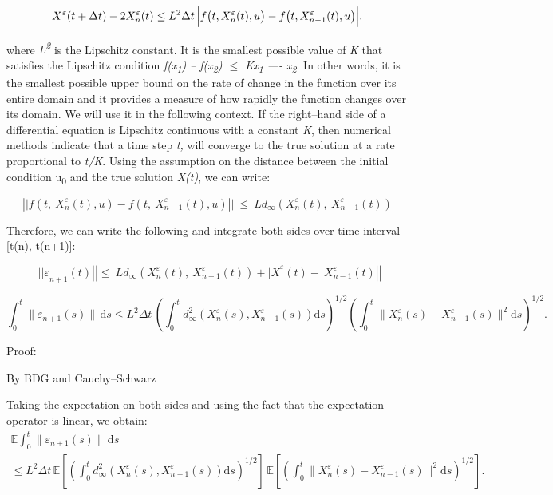\documentclass[12pt,a4paper]{report}
\numberwithin{equation}{section}
\begin{document}
\[
X^{\varepsilon}(t+\Delta t)-2X_{n}^{\varepsilon}(t)
\le L^{2}\Delta t\,
\Bigl|f\bigl(t,X_{n}^{\varepsilon}(t),u\bigr)-f\bigl(t,X_{n-1}^{\varepsilon}(t),u\bigr)\Bigr|.
\]


where \emph{L\textsuperscript{2}} is the Lipschitz constant. It is the
smallest possible value of \emph{K} that satisfies the Lipschitz
condition \textbar{}\emph{f(x\textsubscript{1}) --
f(x\textsubscript{2})\textbar{} $\leq$ K\textbar x\textsubscript{1} ----
x\textsubscript{2}}\textbar. In other words, it is the smallest possible
upper bound on the rate of change in the function over its entire domain
and it provides a measure of how rapidly the function changes over its
domain. We will use it in the following context. If the right--hand side
of a differential equation is Lipschitz continuous with a constant
\emph{K}, then numerical methods indicate that a time step \emph{t,}
will converge to the true solution at a rate proportional to \emph{t/K}.
Using the assumption on the distance between the initial condition
u\textsubscript{0} and the true solution \emph{X(t)}, we can write:

\[\left| |f\left( t,\ X_{n}^{\varepsilon}(t),u \right) - f\left( t,\ X_{n - 1}^{\varepsilon}(t),u \right) \right||\  \leq \ {Ld}_{\infty}(X_{n}^{\varepsilon}(t),\ X_{n - 1}^{\varepsilon}(t))\]

Therefore, we can write the following and integrate both sides over time interval [t(n), t(n+1)]:  

\[\ \ {||\varepsilon}_{n + 1}(t)\left| \left| \leq \ {Ld_{\infty}\left( X_{n}^{\varepsilon}(t),\ X_{n - 1}^{\varepsilon}(t) \right) + |X}^{\varepsilon}(t) - \ X_{n - 1}^{\varepsilon}(t) \right| \right|\]

\[
\int_{0}^{t}\bigl\|\varepsilon_{n+1}(s)\bigr\|\,\mathrm{d}s
\le L^{2}\Delta t\,
\left(\int_{0}^{t} d_{\infty}^{2}\!\left(X_{n}^{\varepsilon}(s),X_{n-1}^{\varepsilon}(s)\right)\mathrm{d}s\right)^{1/2}
\left(\int_{0}^{t}\bigl\|X_{n}^{\varepsilon}(s)-X_{n-1}^{\varepsilon}(s)\bigr\|^{2}\mathrm{d}s\right)^{1/2}.
\]


Proof:

By BDG and Cauchy--Schwarz

Taking the expectation on both sides and using the fact that the
expectation operator is linear, we obtain:
\[
\begin{gathered}
\mathbb{E}\!\int_{0}^{t}\bigl\|\varepsilon_{n+1}(s)\bigr\|\,\mathrm{d}s \\
\le L^{2}\Delta t\,
\mathbb{E}\!\left[\left(\int_{0}^{t}
d_{\infty}^{2}\!\left(X_{n}^{\varepsilon}(s),X_{n-1}^{\varepsilon}(s)\right)\mathrm{d}s\right)^{1/2}\right]\,
\mathbb{E}\!\left[\left(\int_{0}^{t}
\bigl\|X_{n}^{\varepsilon}(s)-X_{n-1}^{\varepsilon}(s)\bigr\|^{2}\mathrm{d}s\right)^{1/2}\right].
\end{gathered}
\]
\end{document}
